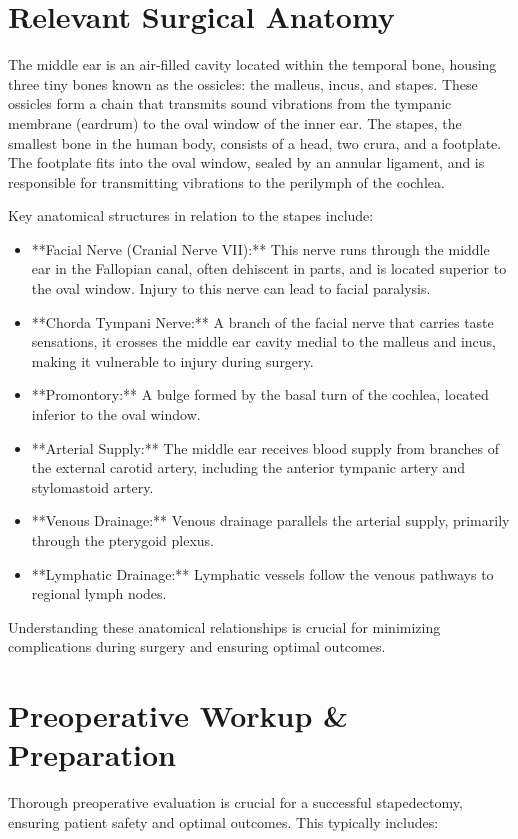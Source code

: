 \section*{Relevant Surgical Anatomy}
The middle ear is an air-filled cavity located within the temporal bone, housing three tiny bones known as the ossicles: the malleus, incus, and stapes. These ossicles form a chain that transmits sound vibrations from the tympanic membrane (eardrum) to the oval window of the inner ear. The stapes, the smallest bone in the human body, consists of a head, two crura, and a footplate. The footplate fits into the oval window, sealed by an annular ligament, and is responsible for transmitting vibrations to the perilymph of the cochlea. 

Key anatomical structures in relation to the stapes include:

\begin{itemize}
  \item **Facial Nerve (Cranial Nerve VII):** This nerve runs through the middle ear in the Fallopian canal, often dehiscent in parts, and is located superior to the oval window. Injury to this nerve can lead to facial paralysis.
  \item **Chorda Tympani Nerve:** A branch of the facial nerve that carries taste sensations, it crosses the middle ear cavity medial to the malleus and incus, making it vulnerable to injury during surgery.
  \item **Promontory:** A bulge formed by the basal turn of the cochlea, located inferior to the oval window.
  \item **Arterial Supply:** The middle ear receives blood supply from branches of the external carotid artery, including the anterior tympanic artery and stylomastoid artery.
  \item **Venous Drainage:** Venous drainage parallels the arterial supply, primarily through the pterygoid plexus.
  \item **Lymphatic Drainage:** Lymphatic vessels follow the venous pathways to regional lymph nodes.
\end{itemize}

Understanding these anatomical relationships is crucial for minimizing complications during surgery and ensuring optimal outcomes.

\section*{Preoperative Workup \& Preparation}
Thorough preoperative evaluation is crucial for a successful stapedectomy, ensuring patient safety and optimal outcomes. This typically includes:

